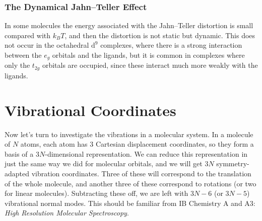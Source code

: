 \documentclass{article}
\theoremstyle{plain}\theoremheaderfont{\normalfont\itshape}\theorembodyfont{\rmfamily}\theoremseparator{.}\newtheorem*{rem}{Remark}\newtheorem*{ex}{Example}\newtheorem*{proof}{Proof}\newtheorem*{altp}{Alternative proof}
\theoremstyle{plain}\theoremheaderfont{\normalfont\bfseries}\theorembodyfont{\rmfamily}\theoremseparator{.}\newtheorem{thm}{Theorem}[section]\newtheorem{lem}[thm]{Lemma}\newtheorem{prop}[thm]{Proposition}\newtheorem*{cor}{Corollary}\newtheorem{defn}[thm]{Definition}\newtheorem{clm}[thm]{Claim}\newtheorem{clminproof}{Claim}\newtheorem*{law}{Law}\newtheorem{pos}[thm]{Postulate}
\theoremstyle{break}\theoremheaderfont{\normalfont\itshape}\theorembodyfont{\rmfamily}\theoremseparator{.\medskip}\newtheorem*{proofskip}{Proof}\newtheorem*{exs}{Examples}\newtheorem*{rems}{Remarks}
\theoremstyle{break}\theoremheaderfont{\normalfont\bfseries}\theorembodyfont{\rmfamily}\theoremseparator{.\medskip}\newtheorem{lemskip}[thm]{Lemma}\newtheorem{defnskip}[thm]{Definition}\newtheorem{propskip}[thm]{Proposition}\newtheorem{thmskip}[thm]{Theorem}
\numberwithin{equation}{section}
\begin{document}
    \subsubsection{The Dynamical Jahn--Teller Effect}
    In some molecules the energy associated with the Jahn--Teller distortion is small compared with \(k_B T\), and then the distortion is not static but dynamic. This does not occur in the octahedral \(\mathrm{d}^9\) complexes, where there is a strong interaction between the \(e_g\) orbitals and the ligands, but it is common in complexes where only the \(t_{2g}\) orbitals are occupied, since these interact much more weakly with the ligands.

    \newpage
    \section{Vibrational Coordinates}
    Now let's turn to investigate the vibrations in a molecular system. In a molecule of \(N\) atoms, each atom has \(3\) Cartesian displacement coordinates, so they form a basis of a \(3N\)-dimensional representation. We can reduce this representation in just the same way we did for molecular orbitals, and we will get \(3N\) symmetry-adapted vibration coordinates. Three of these will correspond to the translation of the whole molecule, and another three of these correspond to rotations (or two for linear molecules). Subtracting these off, we are left with \(3N-6\) (or \(3N-5\)) vibrational normal modes. This should be familiar from IB Chemistry A and A3: \textit{High Resolution Molecular Spectroscopy}.
\end{document}
